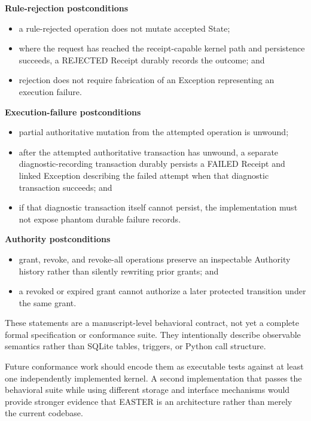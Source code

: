 \documentclass[11pt]{article}
\begin{document}
\textbf{Rule-rejection postconditions}

\begin{itemize}
\item a rule-rejected operation does not mutate accepted State;
\item where the request has reached the receipt-capable kernel path and persistence succeeds, a REJECTED Receipt durably records the outcome; and
\item rejection does not require fabrication of an Exception representing an execution failure.
\end{itemize}

\textbf{Execution-failure postconditions}

\begin{itemize}
\item partial authoritative mutation from the attempted operation is unwound;
\item after the attempted authoritative transaction has unwound, a separate diagnostic-recording transaction durably persists a FAILED Receipt and linked Exception describing the failed attempt when that diagnostic transaction succeeds; and
\item if that diagnostic transaction itself cannot persist, the implementation must not expose phantom durable failure records.
\end{itemize}

\textbf{Authority postconditions}

\begin{itemize}
\item grant, revoke, and revoke-all operations preserve an inspectable Authority history rather than silently rewriting prior grants; and
\item a revoked or expired grant cannot authorize a later protected transition under the same grant.
\end{itemize}

These statements are a manuscript-level behavioral contract, not yet a complete formal specification or conformance suite. They intentionally describe observable semantics rather than SQLite tables, triggers, or Python call structure.

Future conformance work should encode them as executable tests against at least one independently implemented kernel. A second implementation that passes the behavioral suite while using different storage and interface mechanisms would provide stronger evidence that EASTER is an architecture rather than merely the current codebase.
\end{document}
